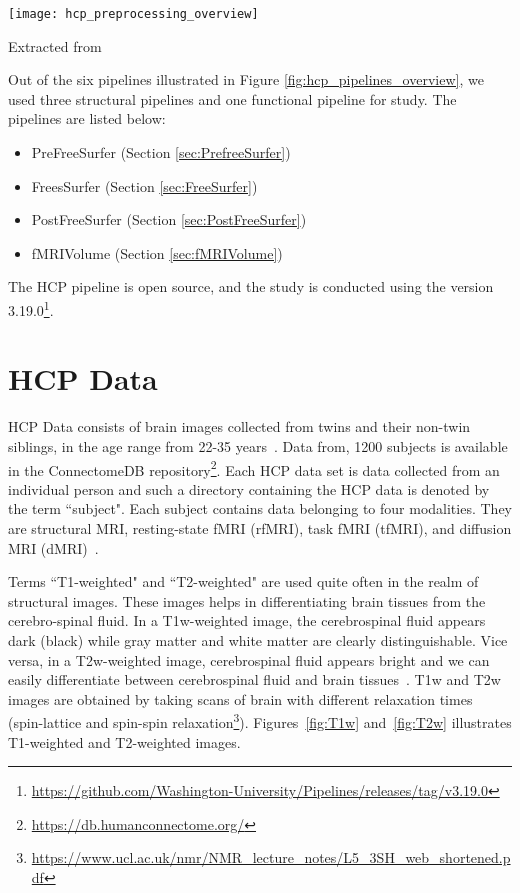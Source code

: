 \begin{center}
   \texttt{[image: hcp\_preprocessing\_overview]}
   \label{fig:hcp_pipelines_overview}
   \caption*{Extracted from \cite{Gla13}}
\end{center}

Out of the six pipelines illustrated in Figure \ref{fig:hcp_pipelines_overview}, we used three structural pipelines and one functional pipeline for study. The pipelines are listed below:
\begin{itemize}
  \item PreFreeSurfer (Section \ref{sec:PrefreeSurfer})
  \item FreesSurfer   (Section \ref{sec:FreeSurfer})
  \item PostFreeSurfer (Section \ref{sec:PostFreeSurfer})
  \item fMRIVolume    (Section \ref{sec:fMRIVolume})
\end{itemize}

The HCP pipeline is open source, and the study is conducted using the version 3.19.0\footnote{\url{https://github.com/Washington-University/Pipelines/releases/tag/v3.19.0}}.

\section{HCP Data} \label{HCP_Data}
HCP Data consists of brain images collected from twins and their non-twin siblings, in the age range from 22-35 years~\cite{HCPData}. Data from, 1200 subjects is available in the ConnectomeDB repository\footnote{\url{https://db.humanconnectome.org/}}. Each HCP data set is data collected from an individual person and such a directory containing the HCP data is denoted by the term ``subject". Each subject contains data belonging to four modalities. They are structural MRI, resting-state fMRI (rfMRI), task fMRI (tfMRI), and diffusion MRI (dMRI)~\cite{HCPData}.

Terms ``T1-weighted" and ``T2-weighted" are used quite often in the realm of structural images. These images helps in differentiating brain tissues from the cerebro-spinal fluid. In a T1w-weighted image, the cerebrospinal fluid appears dark (black) while gray matter and white matter are clearly distinguishable. Vice versa, in a T2w-weighted image, cerebrospinal fluid appears bright and we can easily differentiate between cerebrospinal fluid and brain tissues~\cite{t1w_t2w}. T1w and T2w images are obtained by taking scans of brain with different relaxation times (spin-lattice and spin-spin relaxation\footnote{\url{https://www.ucl.ac.uk/nmr/NMR_lecture_notes/L5_3SH_web_shortened.pdf}}).
Figures~\ref{fig:T1w} and~\ref{fig:T2w} illustrates T1-weighted and T2-weighted images.

